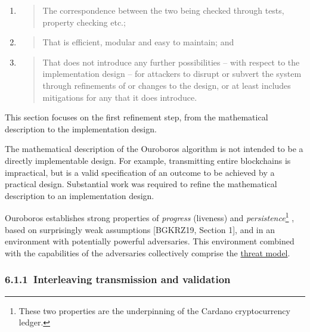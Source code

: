 \documentclass[11pt,a4paper]{article}
\begin{document}
\begin{enumerate}
  \begin{enumerate}
  \def\labelenumii{\alph{enumii}.}
  \setcounter{enumii}{3}
  \item
    \begin{quote}
    The correspondence between the two being checked through tests,
    property checking etc.;
    \end{quote}
  \item
    \begin{quote}
    That is efficient, modular and easy to maintain; and
    \end{quote}
  \item
    \begin{quote}
    That does not introduce any further possibilities -- with respect to
    the implementation design -- for attackers to disrupt or subvert the
    system through refinements of or changes to the design, or at least
    includes mitigations for any that it does introduce.
    \end{quote}
  \end{enumerate}
\end{enumerate}

This section focuses on the first refinement step, from the mathematical
description to the implementation design.

The mathematical description of the Ouroboros algorithm is not intended
to be a directly implementable design. For example, transmitting entire
blockchains is impractical, but is a valid specification of an outcome
to be achieved by a practical design. Substantial work was required to
refine the mathematical description to an implementation design.

Ouroboros establishes strong properties of \emph{progress} (liveness)
and \emph{persistence}\footnote{These two properties are the
  underpinning of the Cardano cryptocurrency ledger.} , based on
surprisingly weak assumptions {[}BGKRZ19, Section 1{]}, and in an
environment with potentially powerful adversaries. This environment
combined with the capabilities of the adversaries collectively comprise
the \protect\hyperlink{high-level-threat-model}{{threat model}}.

\hypertarget{interleaving-transmission-and-validation}{%
\subsubsection{​6.1.1​~Interleaving transmission and
validation}\label{interleaving-transmission-and-validation}}
\end{document}
